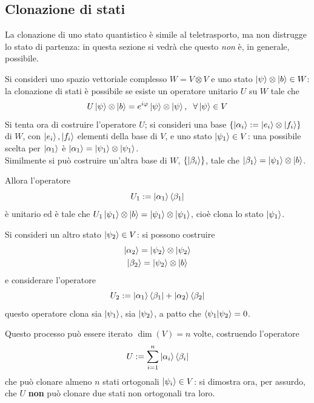 \newpage
\subsection{Clonazione di stati}
La clonazione di uno stato quantistico è simile al teletrasporto, ma non distrugge lo stato di
partenza: in questa sezione si vedrà che questo \textit{non} è, in generale, possibile.

Si consideri uno spazio vettoriale complesso $W=V\otimes V$ e uno stato
$\ket{\psi}\otimes\ket{b}\in W$: la clonazione di stati è possibile se esiste un operatore
unitario $U$ su $W$ tale che
$$U\ket{\psi}\otimes\ket{b}=e^{i\varphi}\ket{\psi}\otimes\ket{\psi},\phantom{x}
\forall\ket{\psi}\in V$$
Si tenta ora di costruire l'operatore $U$; si consideri una base $\left\{\ket{\alpha_i}:=\ket{e_i}
\otimes\ket{f_i}\right\}$ di $W$, con $\ket{e_i},\ket{f_i}$ elementi della base di $V$, e uno stato
$\ket{\psi_1}\in V$:
una possibile scelta per $\ket{\alpha_1}$ è
$\ket{\alpha_1}=\ket{\psi_1}\otimes\ket{\psi_1}$.\\
Similmente si può costruire un'altra base di $W$, $\left\{\ket{\beta_i}\right\}$, tale che
$\ket{\beta_1}=\ket{\psi_1}\otimes\ket{b}$.

Allora l'operatore
$$U_1:=\ket{\alpha_1}\bra{\beta_1}$$
è unitario ed è tale che $U_1\ket{\psi_1}\otimes\ket{b}=\ket{\psi_1}\otimes\ket{\psi_1}$, cioè clona
lo stato $\ket{\psi_1}$.

Si consideri un altro stato $\ket{\psi_2}\in V$: si possono costruire
\begin{gather*}
\ket{\alpha_2}=\ket{\psi_2}\otimes\ket{\psi_2}\\
\ket{\beta_2}=\ket{\psi_2}\otimes\ket{b}
\end{gather*}
e considerare l'operatore
$$U_2:=\ket{\alpha_1}\bra{\beta_1}+\ket{\alpha_2}\bra{\beta_2}$$
questo operatore clona sia $\ket{\psi_1}$, sia $\ket{\psi_2}$, a patto che
$\bra{\psi_1}\ket{\psi_2}=0$.

Questo processo può essere iterato $\dim(V)=n$ volte, costruendo l'operatore
$$U:=\sum_{i=1}^{n}\ket{\alpha_i}\bra{\beta_i}$$
che può clonare almeno $n$ stati ortogonali $\ket{\psi_i}\in V$: si dimostra ora, per assurdo, che
$U$ \textbf{non} può clonare due stati non ortogonali tra loro.

